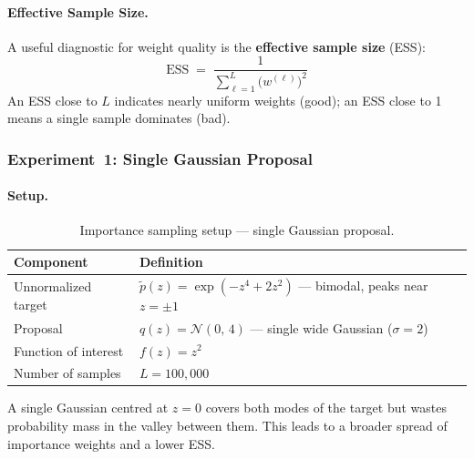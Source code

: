 \documentclass[12pt, a4paper]{article}
\begin{document}
\paragraph{Effective Sample Size.}
A useful diagnostic for weight quality is the \textbf{effective
sample size} (ESS):
\begin{equation}
    \mathrm{ESS} \;=\;
    \frac{1}{\sum_{\ell=1}^{L}\bigl(w^{(\ell)}\bigr)^2}
    \label{eq:ess}
\end{equation}
An ESS close to $L$ indicates nearly uniform weights (good);
an ESS close to 1 means a single sample dominates (bad).

\subsubsection{Experiment~1: Single Gaussian Proposal}

\paragraph{Setup.}
\begin{table}[H]
    \centering
    \begin{tabular}{ll}
        \toprule
        \textbf{Component} & \textbf{Definition} \\
        \midrule
        Unnormalized target
            & $\tilde{p}(z) = \exp(-z^4 + 2z^2)$
              — bimodal, peaks near $z = \pm 1$ \\
        Proposal
            & $q(z) = \mathcal{N}(0,\, 4)$
              — single wide Gaussian ($\sigma = 2$) \\
        Function of interest
            & $f(z) = z^2$ \\
        Number of samples
            & $L = 100{,}000$ \\
        \bottomrule
    \end{tabular}
    \caption{Importance sampling setup --- single Gaussian proposal.}
    \label{tab:is1_setup}
\end{table}

A single Gaussian centred at $z = 0$ covers both modes of the target
but wastes probability mass in the valley between them.  This leads
to a broader spread of importance weights and a lower ESS.
\end{document}
